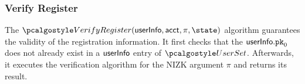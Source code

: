 \subsubsection{Verify Register}


The $\verreg(\userinfo, \acct, \pi, \state)$ algorithm guarantees the validity of the registration information. It first checks that the $\textup{\textsf{userInfo}}.\textup{\texttt{pk}}_{0}$ does not already exist in a $\textup{\textsf{userInfo}}$ entry of $\usersset$. Afterwards, it executes the verification algorithm for the NIZK argument $\pi$ and returns its result.


